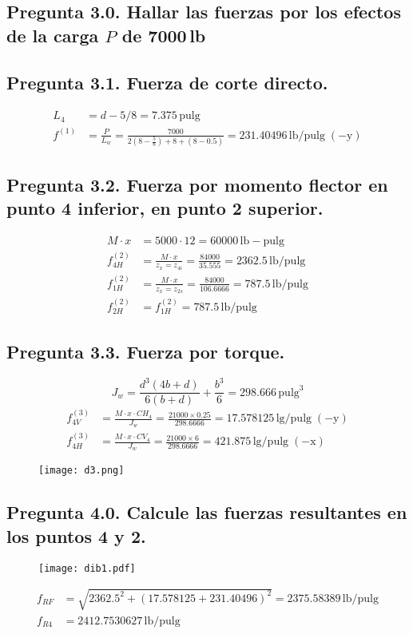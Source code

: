 \documentclass[a4paper,11pt]{article}
\newcommand{\mrm}{\mathrm}
\begin{document}
\subsection*{Pregunta 3.0. Hallar las fuerzas por los efectos de la carga $P$ de 7000$\,$lb}
\subsection*{Pregunta 3.1. Fuerza de corte directo.}
\begin{align*}
L_{4} &= d - 5/8 = 7.375\,\mrm{pulg}\\
f^{(1)} &= \frac{P}{L_{w}} = \frac{7000}{2(8-\frac{5}{8}) + 8 + (8-0.5)} = 231.40496\,\mrm{lb/pulg}\;(-\mrm{y})
\end{align*}
\subsection*{Pregunta 3.2. Fuerza por momento flector en punto 4 inferior, en punto 2 superior.}
\begin{align*}
M\cdot x &= 5000\cdot 12 = 60000\,\mrm{lb-pulg}\\
f^{(2)}_{4H} &= \frac{M\cdot x}{z_{x} = z_{4i}} = \frac{84000}{35.555} = 2362.5\,\mrm{lb/pulg}\\
f^{(2)}_{1H} &= \frac{M\cdot x}{z_{x} = z_{2s}} = \frac{84000}{106.6666} = 787.5\,\mrm{lb/pulg}\\
f^{(2)}_{2H} &= f^{(2)}_{1H} = 787.5\,\mrm{lb/pulg}
\end{align*}
\subsection*{Pregunta 3.3. Fuerza por torque.}
$$
J_{w} = \frac{d^{3}(4b+d)}{6(b+d)} + \frac{b^{3}}{6} = 298.666\,\mrm{pulg}^{3}
$$
\begin{align*}
    f^{(3)}_{4V} &= \frac{M\cdot x \cdot CH_{4}}{J_{w}} = \frac{21000\times 0.25}{298.6666} = 17.578125\,\mrm{lg/pulg}\;(-\mrm{y})\\
    f^{(3)}_{4H} &= \frac{M\cdot x \cdot CV_{4}}{J_{w}} = \frac{21000\times 6}{298.6666} = 421.875\,\mrm{lg/pulg}\;(-\mrm{x})
\end{align*}
\begin{figure}[H]
    \centering
    \texttt{[image: d3.png]}
\end{figure}
\subsection*{Pregunta 4.0. Calcule las fuerzas resultantes en los puntos 4 y 2.}
\begin{figure}
    \centering
    \texttt{[image: dib1.pdf]}
\end{figure}
\begin{align*}
    f_{RF} &= \sqrt{2362.5^{2} + (17.578125+231.40496)^{2}} = 2375.58389\,\mrm{lb/pulg}\\
    f_{R4} &= 2412.7530627\,\mrm{lb/pulg} 
\end{align*}
\end{document}
